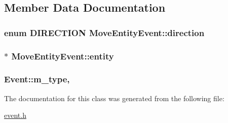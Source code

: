 \subsection{Member Data Documentation}
\hypertarget{classMoveEntityEvent_ac55de930d27e83d1eb92968e9c3f41eb}{
\subsubsection[{direction}]{\setlength{\rightskip}{0pt plus 5cm}enum {\bf D\-I\-R\-E\-C\-T\-I\-O\-N} Move\-Entity\-Event\-::direction}}\label{classMoveEntityEvent_ac55de930d27e83d1eb92968e9c3f41eb}
\hypertarget{classMoveEntityEvent_aab414806813e40d92ac4c93fbf981a2b}{
\subsubsection[{entity}]{$\ast$ Move\-Entity\-Event\-::entity}}\label{classMoveEntityEvent_aab414806813e40d92ac4c93fbf981a2b}
\hypertarget{classEvent_a38264e3fb229dc64123dff1d5a7dcf9e}{
\subsubsection[{m\-\_\-type}]{ Event\-::m\-\_\-type\hspace{0.3cm}{\ttfamily [protected]}, {\ttfamily [inherited]}}}\label{classEvent_a38264e3fb229dc64123dff1d5a7dcf9e}


The documentation for this class was generated from the following file\-:\begin{DoxyCompactItemize}
\item 
\hyperlink{event_8h}{event.\-h}\end{DoxyCompactItemize}
